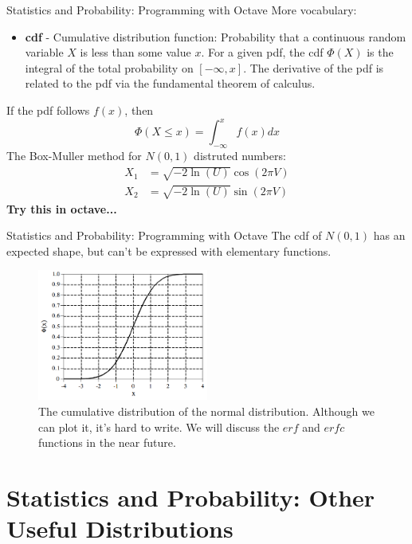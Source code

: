 \documentclass{beamer}
\begin{document}
\begin{frame}[fragile]{Statistics and Probability: Programming with Octave}
\small
More vocabulary:
\begin{itemize}
\item \textbf{cdf} - Cumulative distribution function: Probability that a continuous random variable $X$ is less than some value $x$.  For a given pdf, the cdf $\Phi(X)$ is the integral of the total probability on $[-\infty,x]$.  The derivative of the pdf is related to the pdf via the fundamental theorem of calculus.
\end{itemize}
If the pdf follows $f(x)$, then 
\begin{equation}
\Phi(X\leq x) = \int_{-\infty}^{x} f(x) dx
\end{equation}
The Box-Muller method for $N(0,1)$ distruted numbers:
\begin{align}
X_1 &= \sqrt{-2\ln(U)}\cos(2\pi V) \\
X_2 &= \sqrt{-2\ln(U)}\sin(2\pi V)
\end{align}
\textbf{Try this in octave...}
\end{frame}

\begin{frame}[fragile]{Statistics and Probability: Programming with Octave}
The cdf of $N(0,1)$ has an expected shape, but can't be expressed with elementary functions.
\begin{figure}
\centering
\includegraphics[width=0.5\textwidth]{figures/cdfgaus.png}
\caption{\label{fig:cdfgaus} The cumulative distribution of the normal distribution.  Although we can plot it, it's hard to write.  We will discuss the $erf$ and $erfc$ functions in the near future.}
\end{figure}
\end{frame}

\section{Statistics and Probability: Other Useful Distributions}
\end{document}
